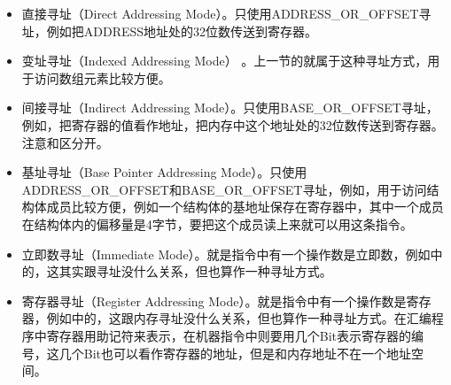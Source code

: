 \begin{itemize}

\item 直接寻址（Direct Addressing Mode）。只使用ADDRESS\_\BookSplit{}OR\_\BookSplit{}OFFSET寻址，例如把ADDRESS地址处的32位数传送到寄存器。

\item 变址寻址（Indexed Addressing Mode） 。上一节的就属于这种寻址方式，用于访问数组元素比较方便。

\item 间接寻址（Indirect Addressing Mode）。只使用BASE\_\BookSplit{}OR\_\BookSplit{}OFFSET寻址，例如，把寄存器的值看作地址，把内存中这个地址处的32位数传送到寄存器。注意和区分开。

\item 基址寻址（Base Pointer Addressing Mode）。只使用ADDRESS\_\BookSplit{}OR\_\BookSplit{}OFFSET和BASE\_\BookSplit{}OR\_\BookSplit{}OFFSET寻址，例如，用于访问结构体成员比较方便，例如一个结构体的基地址保存在寄存器中，其中一个成员在结构体内的偏移量是4字节，要把这个成员读上来就可以用这条指令。

\item 立即数寻址（Immediate Mode）。就是指令中有一个操作数是立即数，例如中的，这其实跟寻址没什么关系，但也算作一种寻址方式。

\item 寄存器寻址（Register Addressing Mode）。就是指令中有一个操作数是寄存器，例如中的，这跟内存寻址没什么关系，但也算作一种寻址方式。在汇编程序中寄存器用助记符来表示，在机器指令中则要用几个Bit表示寄存器的编号，这几个Bit也可以看作寄存器的地址，但是和内存地址不在一个地址空间。
\end{itemize}



